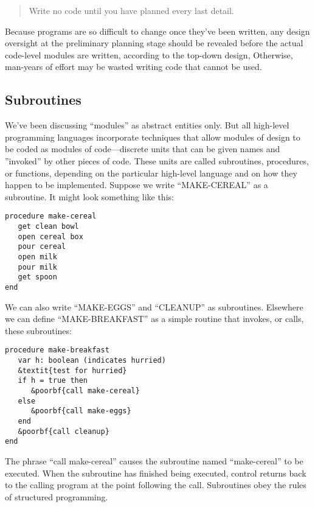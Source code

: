 \begin{quote}
Write no code until you have planned every last detail.
\end{quote}
Because programs are so difficult to change once they've been written,
any design oversight at the preliminary planning stage should be revealed
before the actual code-level modules are written, according to the
top-down design, Otherwise, man-years of effort may be wasted writing
code that cannot be used.


\subsection{Subroutines}

We've been discussing {}``modules'' as abstract entities only. But
all high-level programming languages incorporate techniques that allow
modules of design to be coded as modules of code---discrete units
that can be given names and ''invoked'' by other pieces of code. These
units are called subroutines, procedures, or functions, depending
on the particular high-level language and on how they happen to be
implemented. Suppose we write {}``MAKE-CEREAL'' as a subroutine.
It might look something like this:

\begin{verbatim}
procedure make-cereal
   get clean bowl
   open cereal box
   pour cereal
   open milk
   pour milk
   get spoon
end
\end{verbatim}


We can also write {}``MAKE-EGGS'' and {}``CLEANUP'' as subroutines.
Elsewhere we can define {}``MAKE-BREAKFAST'' as a simple routine
that invokes, or calls, these subroutines:

\begin{Verbatim}[commandchars=\&\{\}]
procedure make-breakfast
   var h: boolean (indicates hurried)
   &textit{test for hurried}
   if h = true then
      &poorbf{call make-cereal}
   else
      &poorbf{call make-eggs}
   end
   &poorbf{call cleanup}
end
\end{Verbatim}


\medskip

The phrase {}``call make-cereal'' causes the subroutine named {}``make-cereal''
to be executed. When the subroutine has finished being executed, control
returns back to the calling program at the point following the call.
Subroutines obey the rules of structured programming.

